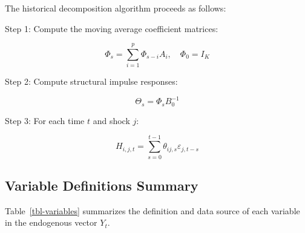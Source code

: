 \documentclass[
  manuscript=article,
  layout=publish,
  year=2026,
  volume=6,
]{den}
\begin{document}
The historical decomposition algorithm proceeds as follows:

Step 1: Compute the moving average coefficient matrices:

\[
\Phi_s = \sum_{i=1}^{p} \Phi_{s-i} A_i, \quad \Phi_0 = I_K
\]

Step 2: Compute structural impulse responses:

\[
\Theta_s = \Phi_s B_0^{-1}
\]

Step 3: For each time \(t\) and shock \(j\):

\[
H_{i,j,t} = \sum_{s=0}^{t-1} \theta_{ij,s} \varepsilon_{j,t-s}
\]

\subsection{Variable Definitions
Summary}\label{variable-definitions-summary}

Table~\ref{tbl-variables} summarizes the definition and data source of
each variable in the endogenous vector \(Y_t\).
\end{document}
